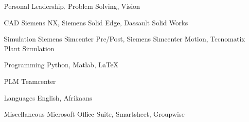 

\begin{cvskills}
  \cvskill
    {Personal} %
    {Leadership, Problem Solving, Vision} %

  \cvskill
    {CAD} %
    {Siemens NX, Siemens Solid Edge, Dassault Solid Works} %

  \cvskill
    {Simulation} %
    {Siemens Simcenter Pre/Post, Siemens Simcenter Motion, Tecnomatix Plant Simulation} %

  \cvskill
    {Programming} %
    {Python, Matlab, LaTeX} %

  \cvskill
    {PLM} %
    {Teamcenter} %

  \cvskill
    {Languages} %
    {English, Afrikaans} %
  
  \cvskill
    {Miscellaneous}
    {Microsoft Office Suite, Smartsheet, Groupwise}

\end{cvskills}
